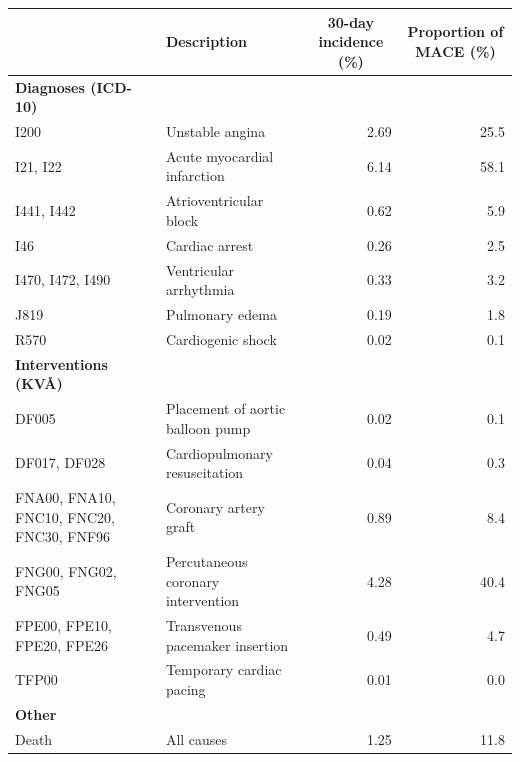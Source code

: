 \documentclass[preprint]{elsarticle}
\begin{document}
\renewcommand{\arraystretch}{1.2}
\begin{table}[H]
  \centering
  \scriptsize
\begin{adjustbox}{center}
\begin{tabular}{@{}p{3.1cm}lrr@{}}
\toprule
& \multicolumn{1}{l}{\textbf{Description}} & \multicolumn{1}{c}{\textbf{30-day incidence (\%)}} & \multicolumn{1}{c}{\textbf{Proportion of MACE (\%)}} \\
\midrule
\textbf{Diagnoses (ICD-10)} & & & \\
\midrule
I200                                          & Unstable angina                                        &  2.69       &   25.5   \\
I21, I22                                      & Acute myocardial infarction                            &  6.14       &   58.1   \\
I441, I442                                    & Atrioventricular block                                 &  0.62       &    5.9   \\
I46                                           & Cardiac arrest                                         &  0.26       &    2.5   \\
I470, I472, I490                              & Ventricular arrhythmia                                 &  0.33       &    3.2   \\
J819                                          & Pulmonary edema                                        &  0.19       &    1.8   \\
R570                                          & Cardiogenic shock                                      &  0.02       &    0.1   \\
\midrule
\textbf{Interventions (KV\AA{})} & & & \\
\midrule
DF005                                         & Placement of aortic balloon pump                       &  0.02       &    0.1   \\
DF017, DF028                                  & Cardiopulmonary resuscitation                          &  0.04       &    0.3   \\
FNA00, FNA10, FNC10, FNC20, FNC30, FNF96      & Coronary artery graft                                  &  0.89       &    8.4   \\
FNG00, FNG02, FNG05                           & Percutaneous coronary intervention                     &  4.28       &   40.4   \\
FPE00, FPE10, FPE20, FPE26                    & Transvenous pacemaker insertion                        &  0.49       &    4.7   \\
TFP00                                         & Temporary cardiac pacing                               &  0.01       &    0.0   \\
\midrule
\textbf{Other} & & & \\
\midrule
Death                                         & All causes                                             &  1.25       &   11.8   \\


\end{tabular}
\end{adjustbox}
\end{table}
\end{document}
